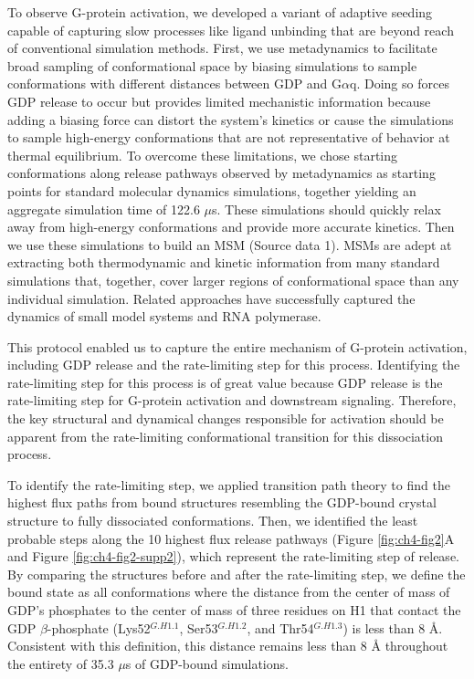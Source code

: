 \documentclass[../main.tex]{subfiles}
\begin{document}
        To observe G-protein activation, we developed a variant of adaptive seeding\cite{Huang:2009bx} capable of capturing slow processes like ligand unbinding that are beyond reach of conventional simulation methods. First, we use metadynamics\cite{Tiwary:2015hw,Laio:2002ft,Dama:2014ef} to facilitate broad sampling of conformational space by biasing simulations to sample conformations with different distances between GDP and G$\alpha$q. Doing so forces GDP release to occur but provides limited mechanistic information because adding a biasing force can distort the system’s kinetics or cause the simulations to sample high-energy conformations that are not representative of behavior at thermal equilibrium. To overcome these limitations, we chose starting conformations along release pathways observed by metadynamics as starting points for standard molecular dynamics simulations, together yielding an aggregate simulation time of 122.6 $\mu$s. These simulations should quickly relax away from high-energy conformations and provide more accurate kinetics. Then we use these simulations to build an MSM (Source data 1). MSMs are adept at extracting both thermodynamic and kinetic information from many standard simulations that, together, cover larger regions of conformational space than any individual simulation\cite{Bowman:2013uj}. Related approaches have successfully captured the dynamics of small model systems\cite{Biswas:2018hc} and RNA polymerase\cite{Zhang:2016ex}.

        This protocol enabled us to capture the entire mechanism of G-protein activation, including GDP release and the rate-limiting step for this process. Identifying the rate-limiting step for this process is of great value because GDP release is the rate-limiting step for G-protein activation and downstream signaling. Therefore, the key structural and dynamical changes responsible for activation should be apparent from the rate-limiting conformational transition for this dissociation process.

        To identify the rate-limiting step, we applied transition path theory\cite{Noe:2009en,Weinan:2006vr} to find the highest flux paths from bound structures resembling the GDP-bound crystal structure to fully dissociated conformations. Then, we identified the least probable steps along the 10 highest flux release pathways (Figure \ref{fig:ch4-fig2}A and Figure \ref{fig:ch4-fig2-supp2}), which represent the rate-limiting step of release. By comparing the structures before and after the rate-limiting step, we define the bound state as all conformations where the distance from the center of mass of GDP’s phosphates to the center of mass of three residues on H1 that contact the GDP $\beta$-phosphate (Lys52$^{G.H1.1}$, Ser53$^{G.H1.2}$, and Thr54$^{G.H1.3}$) is less than 8 \AA{}. Consistent with this definition, this distance remains less than 8 \AA{} throughout the entirety of 35.3 $\mu$s of GDP-bound simulations.
\end{document}
